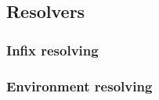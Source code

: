 \subsection{Resolvers}


\subsubsection{Infix resolving}


\subsubsection{Environment resolving}




